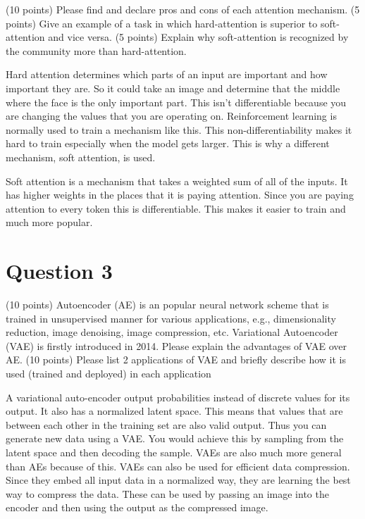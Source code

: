 \documentclass{article}
\begin{document}
(10 points) Please find and declare pros and cons of each attention mechanism.
(5 points) Give an example of a task in which hard-attention is superior to soft-attention and vice versa.
(5 points) Explain why soft-attention is recognized by the community more than hard-attention.

Hard attention determines which parts of an input are important and how important they are. So it could take an image and determine that the middle where the face is the only important part. This isn't differentiable because you are changing the values that you are operating on. Reinforcement learning is normally used to train a mechanism like this. This non-differentiability makes it hard to train especially when the model gets larger. This is why a different mechanism, soft attention, is used.

Soft attention is a mechanism that takes a weighted sum of all of the inputs. It has higher weights in the places that it is paying attention. Since you are paying attention to every token this is differentiable. This makes it easier to train and much more popular.



\section*{Question 3}

(10 points) Autoencoder (AE) is an popular neural network scheme that is trained in unsupervised manner for various applications, e.g., dimensionality reduction, image denoising, image compression, etc. Variational Autoencoder (VAE) is firstly introduced in 2014. Please explain the advantages of VAE over AE.
(10 points) Please list 2 applications of VAE and briefly describe how it is used (trained and deployed) in
each application


A variational auto-encoder output probabilities instead of discrete values for its output. It also has a normalized latent space. This means that values that are between each other in the training set are also valid output. Thus you can generate new data using a VAE. You would achieve this by sampling from the latent space and then decoding the sample. VAEs are also much more general than AEs because of this. VAEs can also be used for efficient data compression. Since they embed all input data in a normalized way, they are learning the best way to compress the data. These can be used by passing an image into the encoder and then using the output as the compressed image.
\end{document}
